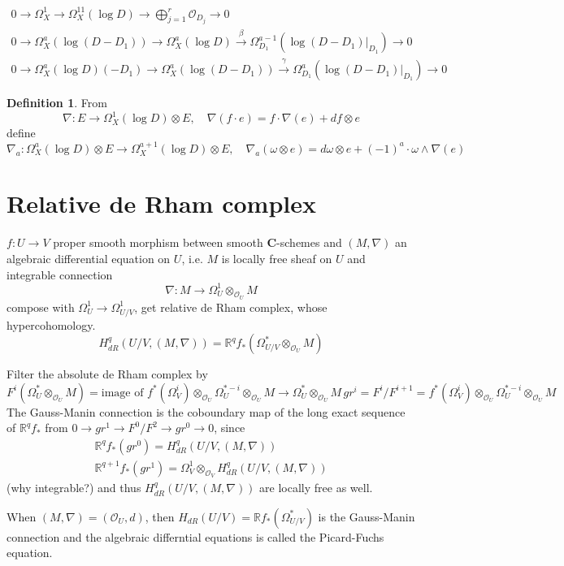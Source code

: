 \documentclass[leqno]{amsart}
\newcommand{\C}{\mathbf C}
\newcommand{\1}{\mathbf{1}}
\theoremstyle{definition}
\newtheorem{defn}[thm]{Definition}
\theoremstyle{remark}
\begin{document}
\begin{gather*}
	0\to \Omega_X^1\to \Omega_X^11(\log D)\to 
	\bigoplus_{j=1}^r\mathcal{O}_{D_j}\to 0\\
	0\to \Omega_X^a(\log(D-D_1))\to 
	\Omega_X^a(\log D)\xrightarrow{\beta}
	\Omega_{D_1}^{a-1}(\log(D-D_1)\vert_{D_1})\to 0\\
	0\to \Omega_X^a(\log D)(-D_1)\to
	\Omega_X^a(\log(D-D_1))\xrightarrow{\gamma}
	\Omega_{D_1}^a(\log(D-D_1)\vert_{D_1})\to 0
\end{gather*}

\begin{defn}
	From 
	\[
		\nabla\colon E\to \Omega_X^1(\log D)\otimes E,\quad
		\nabla(f\cdot e)=f\cdot \nabla(e)+df\otimes e
	\]
	define 
	\[
		\nabla_a\colon \Omega_X^a(\log D)\otimes E
		\to \Omega_X^{a+1}(\log D)\otimes E,\quad
		\nabla_a(\omega\otimes e)=d\omega\otimes e+
		(-1)^a\cdot \omega\wedge\nabla(e)
	\]
\end{defn}

\section{Relative de Rham complex}
$f\colon U\to V$ proper smooth morphism between
smooth  $\C$-schemes
and  $(M,\nabla)$ an algebraic differential equation on  $U$,
i.e. $M$ is locally free sheaf on  $U$ and integrable connection
 \[
	 \nabla\colon M\to \Omega_U^1\otimes_{\mathcal{O}_U}M
\]
compose with $\Omega_U^1\to \Omega_{U/V}^1$,
get relative de Rham complex, whose hypercohomology.
\[
	H^q_{dR}(U/V,(M,\nabla))=
	\mathbb{R}^qf_*(\Omega_{U/V}^*\otimes_{\mathcal{O}_U}M)
\]

Filter the absolute de Rham complex by
\[
	F^i(\Omega_U^*\otimes_{\mathcal{O}_U}M)=
	\text{image of }
	f^*(\Omega_V^i)\otimes_{\mathcal{O}_U}
	\Omega_U^{*-i}\otimes_{\mathcal{O}_U}M
	\to \Omega_U^*\otimes_{\mathcal{O}_U}M\,
	gr^i=F^i/F^{i+1}=
	f^*(\Omega_V^i)\otimes_{\mathcal{O}_U}
	\Omega_U^{*-i}\otimes_{\mathcal{O}_U}M
\]
The Gauss-Manin connection is the coboundary map of the 
long exact sequence of $\mathbb{R}^qf_*$
from 
 $0\to gr^1\to F^0/F^2\to gr^0\to 0$, since
  \begin{gather*}
	  \mathbb{R}^qf_*(gr^0)=H^q_{dR}(U/V,(M,\nabla))\\
	  \mathbb{R}^{q+1}f_*(gr^1)=
	  \Omega_V^1\otimes_{\mathcal{O}_V}H^q_{dR}(U/V,(M,\nabla))
 \end{gather*}
 (why integrable?)
 and thus $H^q_{dR}(U/V,(M,\nabla))$
 are locally free as well.

 When $(M,\nabla)=(\mathcal{O}_U,d)$,
 then  $H_{dR}(U/V)=\mathbb{R}f_*(\Omega_{U/V}^*)$
 is the Gauss-Manin connection
 and the algebraic differntial equations is called
 the Picard-Fuchs equation.
\end{document}
